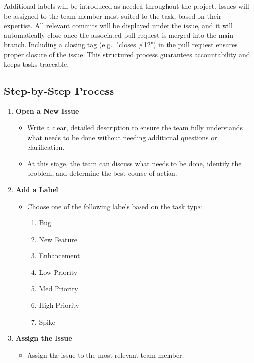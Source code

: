 \documentclass{article}
\begin{document}
Additional labels will be introduced as needed throughout the project. Issues will be 
assigned to the team member most suited to the task, based on their expertise. All 
relevant commits will be displayed under the issue, and it will automatically close once 
the associated pull request is merged into the main branch. Including a closing tag (e.g., "closes \#12") 
in the pull request ensures proper closure of the issue. This structured process guarantees 
accountability and keeps tasks traceable.

\subsection*{Step-by-Step Process}

\begin{enumerate}
    \item \textbf{Open a New Issue}
    \begin{itemize}
        \item Write a clear, detailed description to ensure the team fully understands what needs to 
        be done without needing additional questions or clarification.
        \item At this stage, the team can discuss what needs to be done, identify the problem, 
        and determine the best course of action.
    \end{itemize}

    \item \textbf{Add a Label}
    \begin{itemize}
        \item Choose one of the following labels based on the task type:
        \begin{enumerate}
            \item Bug
            \item New Feature
            \item Enhancement
            \item Low Priority
            \item Med Priority
            \item High Priority
            \item Spike
        \end{enumerate}
    \end{itemize}

    \item \textbf{Assign the Issue}
    \begin{itemize}
        \item Assign the issue to the most relevant team member.
    \end{itemize}
\end{enumerate}
\end{document}
